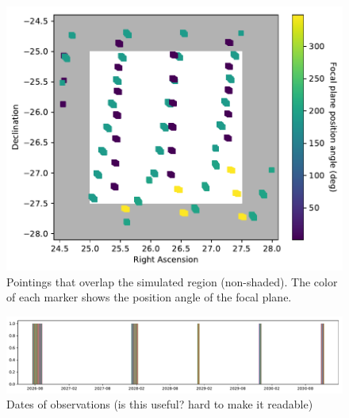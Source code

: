 \documentclass[aps,prd, amsmath,amssymb,superscriptaddress,showkeys,nofootinbib,reprint,preprintnumbers]{revtex4-1}
\begin{document}
\begin{figure}
\begin{center}
\includegraphics[width=\columnwidth]{figures/pointings.pdf}
\end{center}
\caption[]{
Pointings that overlap the simulated region (non-shaded). The color of each marker shows the position angle of the focal plane.
\label{fig:pointings}}
\end{figure}

\begin{figure}
\begin{center}
\includegraphics[width=\textwidth]{figures/dates.pdf}
\end{center}
\caption[]{
Dates of observations (is this useful? hard to make it readable)
\label{fig:dates}}
\end{figure}
\end{document}
